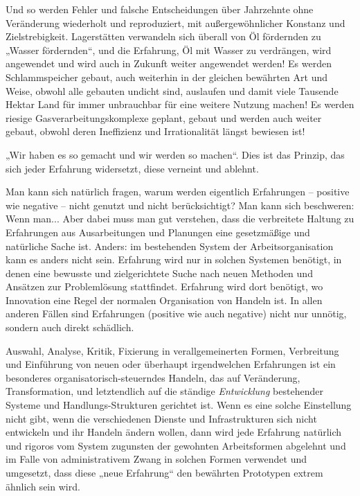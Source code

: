 \documentclass[11pt,a4paper]{article}
\begin{document}
Und so werden Fehler und falsche Entscheidungen über Jahrzehnte ohne
Veränderung wiederholt und reproduziert, mit außergewöhnlicher Konstanz und
Zielstrebigkeit.  Lagerstätten verwandeln sich überall von Öl fördernden zu
„Wasser fördernden“, und die Erfahrung, Öl mit Wasser zu verdrängen, wird
angewendet und wird auch in Zukunft weiter angewendet werden!  Es werden
Schlammspeicher gebaut, auch weiterhin in der gleichen bewährten Art und
Weise, obwohl alle gebauten undicht sind, auslaufen und damit viele Tausende
Hektar Land für immer unbrauchbar für eine weitere Nutzung machen!  Es werden
riesige Gasverarbeitungskomplexe geplant, gebaut und werden auch weiter
gebaut, obwohl deren Ineffizienz und Irrationalität längst bewiesen ist!

„Wir haben es so gemacht und wir werden so machen“. Dies ist das Prinzip, das
sich jeder Erfahrung widersetzt, diese verneint und ablehnt.

Man kann sich natürlich fragen, warum werden eigentlich Erfahrungen --
positive wie negative -- nicht genutzt und nicht berücksichtigt? Man kann sich
beschweren: Wenn man...  Aber dabei muss man gut verstehen, dass die
verbreitete Haltung zu Erfahrungen aus Ausarbeitungen und Planungen eine
gesetzmäßige und natürliche Sache ist.  Anders: im bestehenden System der
Arbeitsorganisation kann es anders nicht sein. Erfahrung wird nur in solchen
Systemen benötigt, in denen eine bewusste und zielgerichtete Suche nach neuen
Methoden und Ansätzen zur Problemlösung stattfindet. Erfahrung wird dort
benötigt, wo Innovation eine Regel der normalen Organisation von Handeln ist.
In allen anderen Fällen sind Erfahrungen (positive wie auch negative) nicht
nur unnötig, sondern auch direkt schädlich.

Auswahl, Analyse, Kritik, Fixierung in verallgemeinerten Formen, Verbreitung
und Einfüh\-rung von neuen oder überhaupt irgendwelchen Erfahrungen ist ein
besonderes organisatorisch-steuerndes Handeln, das auf Veränderung,
Transformation, und letztendlich auf die ständige \emph{Entwicklung}
bestehender Systeme und Handlungs-Strukturen gerichtet ist. Wenn es eine
solche Einstellung nicht gibt, wenn die verschiedenen Dienste und
Infrastrukturen sich nicht entwickeln und ihr Handeln ändern wollen, dann wird
jede Erfahrung natürlich und rigoros vom System zugunsten der gewohnten
Arbeitsformen abgelehnt und im Falle von administrativem Zwang in solchen
Formen verwendet und umgesetzt, dass diese „neue Erfahrung“ den bewährten
Prototypen extrem ähnlich sein wird.
\end{document}
